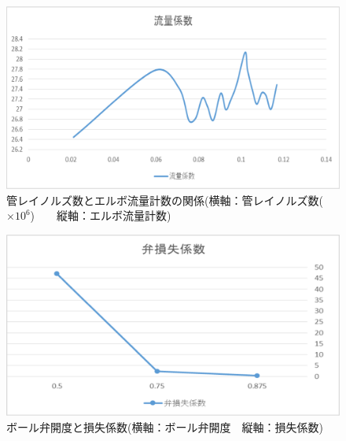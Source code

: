 \documentclass[a4j,twoside,openright,11pt]{jarticle}
\begin{document}
\begin{figure}[htbp]
\begin{center}
\includegraphics[width=12cm]{3.eps}
\end{center}
\caption{管レイノルズ数とエルボ流量計数の関係(横軸：管レイノルズ数($\times10^6$)　　縦軸：エルボ流量計数)}
\end{figure}

\begin{figure}[htbp]
\begin{center}
\includegraphics[width=12cm]{5.eps}
\end{center}
\caption{ボール弁開度と損失係数(横軸：ボール弁開度　縦軸：損失係数)}
\end{figure}
\newpage
\end{document}
